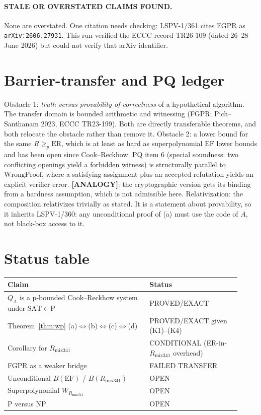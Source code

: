 \documentclass[11pt]{article}
\theoremstyle{definition}
\theoremstyle{remark}
\newcommand{\SAT}{\mathrm{SAT}}
\newcommand{\EF}{\mathrm{EF}}
\newcommand{\WP}{\mathrm{WrongProof}}
\newcommand{\status}[1]{\textbf{[#1]}}
\begin{document}
\paragraph{STALE OR OVERSTATED CLAIMS FOUND.}
None are overstated. One citation needs checking: LSPV-1/361 cites FGPR as \texttt{arXiv:2606.27931}. This run
verified the ECCC record TR26-109 (dated 26--28 June 2026) but could not verify that arXiv identifier.

\section{Barrier-transfer and PQ ledger}
Obstacle 1: \emph{truth versus provability of correctness} of a hypothetical algorithm. The transfer domain is
bounded arithmetic and witnessing (FGPR; Pich--Santhanam 2023, ECCC TR23-199). Both are directly
transferable theorems, and both relocate the obstacle rather than remove it.
Obstacle 2: a lower bound for the same $R\ge_p\mathrm{ER}$, which is at least as hard as superpolynomial $\EF$ lower bounds and
has been open since Cook--Reckhow.
PQ item 6 (special soundness: two conflicting openings yield a forbidden witness) is structurally parallel to
$\WP$, where a satisfying assignment plus an accepted refutation yields an explicit verifier error.
\status{ANALOGY}: the cryptographic version gets its binding from a hardness assumption, which is not admissible here.
Relativization: the composition relativizes trivially as stated. It is a statement about provability, so it inherits LSPV-1/360:
any unconditional proof of (a) must use the code of $A$, not black-box access to it.

\section{Status table}
\begin{tabular}{p{0.56\linewidth}p{0.36\linewidth}}
Claim & Status\\\hline
$Q_A$ is a p-bounded Cook--Reckhow system under $\SAT\in\mathrm P$ & PROVED/EXACT\\
Theorem~\ref{thm:wp} (a)$\Leftrightarrow$(b)$\Leftrightarrow$(c)$\Leftrightarrow$(d) & PROVED/EXACT given (K1)--(K4)\\
Corollary for $R_{\mathrm{mix341}}$ & CONDITIONAL (ER-in-$R_{\mathrm{mix341}}$ overhead)\\
FGPR as a weaker bridge & FAILED TRANSFER\\
Unconditional $B(\EF)$ / $B(R_{\mathrm{mix341}})$ & OPEN\\
Superpolynomial $\overline W_{R_{\mathrm{mix341}}}$ & OPEN\\
P versus NP & OPEN
\end{tabular}
\end{document}
